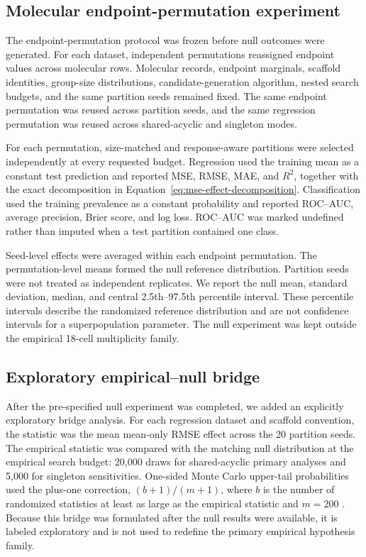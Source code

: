 \subsection{Molecular endpoint-permutation experiment}

The endpoint-permutation protocol was frozen before null outcomes were generated. For each dataset, \NullPermutationN{} independent permutations reassigned endpoint values across molecular rows. Molecular records, endpoint marginals, scaffold identities, group-size distributions, candidate-generation algorithm, nested search budgets, and the same \PartitionSeedN{} partition seeds remained fixed. The same endpoint permutation was reused across partition seeds, and the same regression permutation was reused across shared-acyclic and singleton modes.

For each permutation, size-matched and response-aware partitions were selected independently at every requested budget. Regression used the training mean as a constant test prediction and reported MSE, RMSE, MAE, and $R^2$, together with the exact decomposition in Equation~\ref{eq:mse-effect-decomposition}. Classification used the training prevalence as a constant probability and reported ROC--AUC, average precision, Brier score, and log loss. ROC--AUC was marked undefined rather than imputed when a test partition contained one class.

Seed-level effects were averaged within each endpoint permutation. The \NullPermutationN{} permutation-level means formed the null reference distribution. Partition seeds were not treated as independent replicates. We report the null mean, standard deviation, median, and central 2.5th--97.5th percentile interval. These percentile intervals describe the randomized reference distribution and are not confidence intervals for a superpopulation parameter. The null experiment was kept outside the empirical 18-cell multiplicity family.

\subsection{Exploratory empirical--null bridge}

After the pre-specified null experiment was completed, we added an explicitly exploratory bridge analysis. For each regression dataset and scaffold convention, the statistic was the mean mean-only RMSE effect across the 20 partition seeds. The empirical statistic was compared with the matching null distribution at the empirical search budget: 20,000 draws for shared-acyclic primary analyses and 5,000 for singleton sensitivities. One-sided Monte Carlo upper-tail probabilities used the plus-one correction, $(b+1)/(m+1)$, where $b$ is the number of randomized statistics at least as large as the empirical statistic and $m=200$ \citep{phipson2010permutation}. Because this bridge was formulated after the null results were available, it is labeled exploratory and is not used to redefine the primary empirical hypothesis family.

